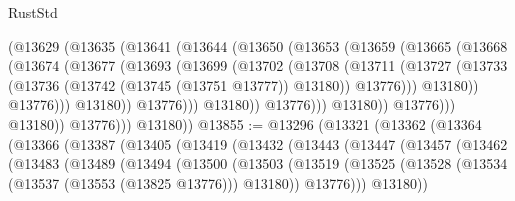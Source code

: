 \begin{lexlean}{RustStd}
\begin{coremodule}
                            (@13629
                              (@13635
                                (@13641
                                  (@13644
                                    (@13650
                                      (@13653
                                        (@13659
                                          (@13665
                                            (@13668
                                              (@13674
                                                (@13677
                                                  (@13693
                                                    (@13699
                                                      (@13702
                                                        (@13708
                                                          (@13711
                                                            (@13727
                                                              (@13733
                                                                (@13736
                                                                  (@13742
                                                                    (@13745 (@13751 @13777))
                                                                    @13180))
                                                                @13776)))
                                                          @13180))
                                                      @13776)))
                                                @13180))
                                            @13776)))
                                      @13180))
                                  @13776)))
                            @13180))
                        @13776)))
                  @13180))
              @13776)))
        @13180))
@13855 := @13296
    (@13321
      (@13362
        (@13364
          (@13366
            (@13387
              (@13405
                (@13419
                  (@13432
                    (@13443
                      (@13447
                        (@13457
                          (@13462
                            (@13483
                              (@13489
                                (@13494
                                  (@13500
                                    (@13503
                                      (@13519
                                        (@13525
                                          (@13528 (@13534 (@13537 (@13553 (@13825 @13776))) @13180))
                                          @13776)))
                                    @13180))

\end{coremodule}
\end{lexlean}
